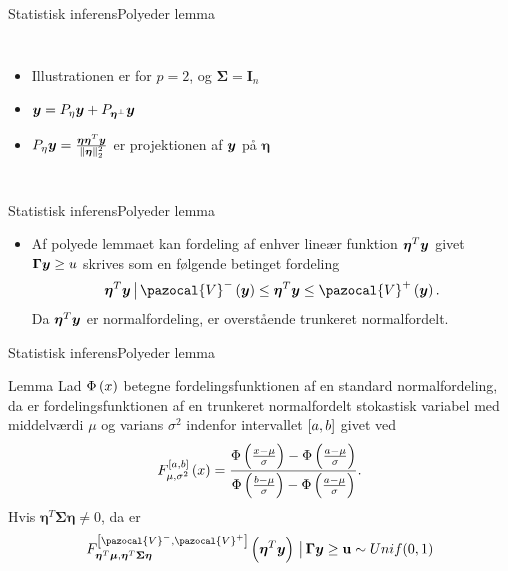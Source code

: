 \begin{frame}{Statistisk inferens}{Polyeder lemma}
\begin{columns}[c]
\column{1.5in}
\begin{itemize}
\item Illustrationen er for $p = 2$, og $\boldsymbol \Sigma = \textbf{I}_n$
\item $\bm{y} = P_{\eta} \bm{y} + P_{\boldsymbol{\eta}^\perp} \bm{y}$
\item$ P_{\eta} \bm{y} = \frac{\boldsymbol \eta \boldsymbol \eta^T\bm{y}}{\Vert \boldsymbol \eta \Vert^2_2}  $ er projektionen af $\bm{y}$ på $\boldsymbol \eta$
\end{itemize}

\column{2.2in}

 \end{columns}
% 
%
\end{frame}

\begin{frame}{Statistisk inferens}{Polyeder lemma}
\begin{itemize}
\item Af polyede lemmaet kan fordeling af enhver lineær funktion $\boldsymbol \eta^T \bm{y}$ givet $\boldsymbol \Gamma \bm{y} \geq u$ skrives som en følgende betinget fordeling
\begin{align*}
\boldsymbol \eta^T \vy \given \pazocal{V}^- \del{\vy} \leq \boldsymbol \eta^T \vy \leq \pazocal{V}^+ \del{\vy}.
\end{align*}
Da $\boldsymbol \eta^T \bm{y} $ er normalfordeling, er overstående trunkeret normalfordelt. 
\end{itemize}
\end{frame}

\begin{frame}{Statistisk inferens}{Polyeder lemma}
\begin{block}{Lemma}
Lad \(\Phi \del{x}\) betegne fordelingsfunktionen af en standard normalfordeling, da er fordelingsfunktionen af en trunkeret normalfordelt stokastisk variabel med middelværdi \(\mu\) og varians \(\sigma^2\) indenfor intervallet \(\sbr{a,b}\) givet ved
\begin{align*}
F_{\mu, \sigma^2}^{\sbr{a,b}} \del{x} = \frac{\Phi\del{\frac{x-\mu}{\sigma}} - \Phi\del{\frac{a-\mu}{\sigma}}}{\Phi\del{\frac{b-\mu}{\sigma}} - \Phi\del{\frac{a-\mu}{\sigma}}}.
\end{align*}
Hvis \(\boldsymbol{\eta}^T \boldsymbol{\Sigma} \boldsymbol{\eta} \neq 0\), da er 
\begin{align*}
F_{\boldsymbol{\eta}^T \vmu, \boldsymbol{\eta}^T \boldsymbol{\Sigma} \boldsymbol{\eta}}^{\sbr{\pazocal{V}^-,\pazocal{V}^+}} \del{\boldsymbol{\eta}^T \vy} \given  \boldsymbol{\Gamma} \vy \geq \mathbf{u} \sim Unif(0,1)
\end{align*}
\end{block}
\end{frame}

